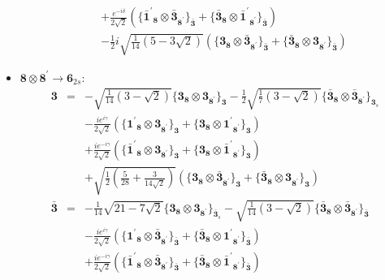 \documentclass[english]{article}
\newcommand{\subcg}[3]{\big\{ {#1}\otimes{#2}\big\}^{}_{#3}}
\newcommand{\rep}[1]{\mathbf{#1}}
\begin{document}
\begin{itemize}
\begin{eqnarray*}
 & & +\frac{e^{-i \delta }}{2 \sqrt{2}}\left(\subcg{\rep{\bar{1}^{\prime}}_{\rep{8}}}{\rep{\bar{3}}_{\rep{8^{\prime}}}}{\rep{\bar{3}}}+\subcg{\rep{\bar{3}}_{\rep{8}}}{\rep{\bar{1}^{\prime}}_{\rep{8^{\prime}}}}{\rep{\bar{3}}}\right) \\ 
 & & -\frac{1}{2} i \sqrt{\frac{1}{14} \left(5-3 \sqrt{2}\right)}\left(\subcg{\rep{3}_{\rep{8}}}{\rep{\bar{3}}_{\rep{8^{\prime}}}}{\rep{\bar{3}}}+\subcg{\rep{\bar{3}}_{\rep{8}}}{\rep{3}_{\rep{8^{\prime}}}}{\rep{\bar{3}}}\right)
\end{eqnarray*}
\item $\rep{8}\otimes\rep{8^{\prime}}\to\rep{6}_{2s}$:
\begin{eqnarray*}
\rep{3} &=& -\sqrt{\frac{1}{14} \left(3-\sqrt{2}\right)}\subcg{\rep{3}_{\rep{8}}}{\rep{3}_{\rep{8^{\prime}}}}{\rep{3}}-\frac{1}{2} \sqrt{\frac{1}{7} \left(3-\sqrt{2}\right)}\subcg{\rep{\bar{3}}_{\rep{8}}}{\rep{\bar{3}}_{\rep{8^{\prime}}}}{\rep{3}_{s}} \\ 
 & & -\frac{i e^{i \gamma }}{2 \sqrt{2}}\left(\subcg{\rep{1^{\prime}}_{\rep{8}}}{\rep{3}_{\rep{8^{\prime}}}}{\rep{3}}+\subcg{\rep{3}_{\rep{8}}}{\rep{1^{\prime}}_{\rep{8^{\prime}}}}{\rep{3}}\right) \\ 
 & & +\frac{i e^{-i \gamma }}{2 \sqrt{2}}\left(\subcg{\rep{\bar{1}^{\prime}}_{\rep{8}}}{\rep{3}_{\rep{8^{\prime}}}}{\rep{3}}+\subcg{\rep{3}_{\rep{8}}}{\rep{\bar{1}^{\prime}}_{\rep{8^{\prime}}}}{\rep{3}}\right) \\ 
 & & +\sqrt{\frac{1}{2} \left(\frac{5}{28}+\frac{3}{14 \sqrt{2}}\right)}\left(\subcg{\rep{3}_{\rep{8}}}{\rep{\bar{3}}_{\rep{8^{\prime}}}}{\rep{3}}+\subcg{\rep{\bar{3}}_{\rep{8}}}{\rep{3}_{\rep{8^{\prime}}}}{\rep{3}}\right)
\\
\rep{\bar{3}} &=& -\frac{1}{14} \sqrt{21-7 \sqrt{2}}\subcg{\rep{3}_{\rep{8}}}{\rep{3}_{\rep{8^{\prime}}}}{\rep{\bar{3}}_{s}}-\sqrt{\frac{1}{14} \left(3-\sqrt{2}\right)}\subcg{\rep{\bar{3}}_{\rep{8}}}{\rep{\bar{3}}_{\rep{8^{\prime}}}}{\rep{\bar{3}}} \\ 
 & & -\frac{i e^{i \gamma }}{2 \sqrt{2}}\left(\subcg{\rep{1^{\prime}}_{\rep{8}}}{\rep{\bar{3}}_{\rep{8^{\prime}}}}{\rep{\bar{3}}}+\subcg{\rep{\bar{3}}_{\rep{8}}}{\rep{1^{\prime}}_{\rep{8^{\prime}}}}{\rep{\bar{3}}}\right) \\ 
 & & +\frac{i e^{-i \gamma }}{2 \sqrt{2}}\left(\subcg{\rep{\bar{1}^{\prime}}_{\rep{8}}}{\rep{\bar{3}}_{\rep{8^{\prime}}}}{\rep{\bar{3}}}+\subcg{\rep{\bar{3}}_{\rep{8}}}{\rep{\bar{1}^{\prime}}_{\rep{8^{\prime}}}}{\rep{\bar{3}}}\right) \\ 

\end{eqnarray*}
\end{itemize}
\end{document}
